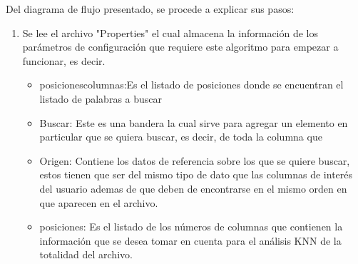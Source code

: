 Del diagrama de flujo presentado, se procede a explicar sus pasos:
\\
\begin{enumerate}
	\item Se lee el archivo "Properties" el cual almacena la información de los parámetros de configuración que requiere este algoritmo para empezar a funcionar, es decir. 
	\begin{itemize}
		\item posicionescolumnas:Es el listado de posiciones donde se encuentran el listado de palabras a buscar
		\item Buscar: Este es una bandera la cual sirve para agregar un elemento en particular que se quiera buscar, es decir, de toda la columna que 
		\item Origen: Contiene los datos de referencia sobre los que se quiere buscar, estos tienen que ser del mismo tipo de dato que las columnas de interés del usuario ademas de que deben de encontrarse en el mismo orden en que aparecen en el archivo.
		\item posiciones: Es el listado de los números de columnas que contienen la información que se desea tomar en cuenta para el análisis KNN de la totalidad del archivo.
	\end{itemize} 
\end{enumerate}
\newpage
